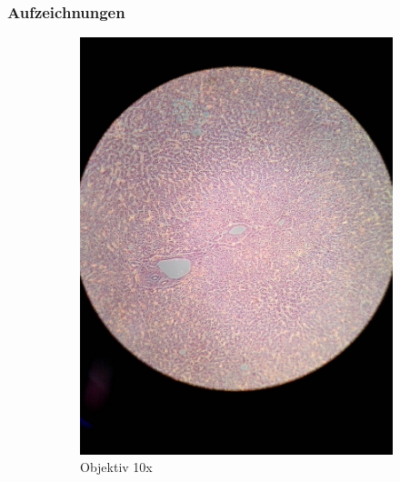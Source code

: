 \subsubsection{Aufzeichnungen}
\begin{figure}[h!]
	\centering
	\begin{subfigure}[b]{0.3\textwidth}
		\includegraphics[width=1\textwidth]{../images/01_human_liver.jpg}
		\caption{Objektiv 10x}
	\end{subfigure}
	\begin{subfigure}[b]{0.3\textwidth}

\end{subfigure}
\end{figure}
